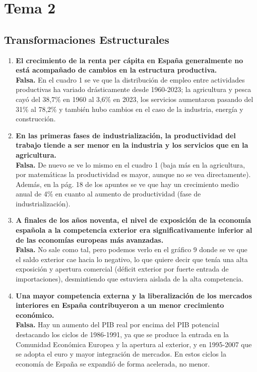 \section{Tema 2}
\subsection*{Transformaciones Estructurales}

\begin{enumerate}[label=\arabic*., series=preguntas]

    \item \textbf{El crecimiento de la renta per cápita en España generalmente no está acompañado de cambios en la estructura productiva.} \\
    \textbf{Falsa.} En el cuadro 1 se ve que la distribución de empleo entre actividades productivas ha variado drásticamente desde 1960-2023; la agricultura y pesca cayó del 38,7\% en 1960 al 3,6\% en 2023, los servicios aumentaron pasando del 31\% al 78,2\% y también hubo cambios en el caso de la industria, energía y construcción.

    \item \textbf{En las primeras fases de industrialización, la productividad del trabajo tiende a ser menor en la industria y los servicios que en la agricultura.} \\
    \textbf{Falsa.} De nuevo se ve lo mismo en el cuadro 1 (baja más en la agricultura, por matemáticas la productividad es mayor, aunque no se vea directamente). Además, en la pág. 18 de los apuntes se ve que hay un crecimiento medio anual de 4\% en cuanto al aumento de productividad (fase de industrialización).

    \item \textbf{A finales de los años noventa, el nivel de exposición de la economía española a la competencia exterior era significativamente inferior al de las economías europeas más avanzadas.} \\
    \textbf{Falsa.} No sale como tal, pero podemos verlo en el gráfico 9 donde se ve que el saldo exterior cae hacia lo negativo, lo que quiere decir que tenía una alta exposición y apertura comercial (déficit exterior por fuerte entrada de importaciones), desmintiendo que estuviera aislada de la alta competencia.

    \item \textbf{Una mayor competencia externa y la liberalización de los mercados interiores en España contribuyeron a un menor crecimiento económico.} \\
    \textbf{Falsa.} Hay un aumento del PIB real por encima del PIB potencial destacando los ciclos de 1986-1991, ya que se produce la entrada en la Comunidad Económica Europea y la apertura al exterior, y en 1995-2007 que se adopta el euro y mayor integración de mercados. En estos ciclos la economía de España se expandió de forma acelerada, no menor.


\end{enumerate}
